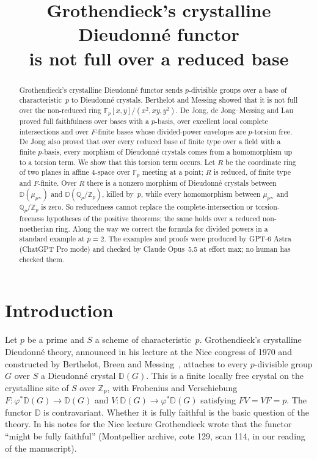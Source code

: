 \documentclass[11pt]{amsart}
\title[Not full over a reduced base]{Grothendieck's crystalline Dieudonn\'e functor\\ is not full over a reduced base}
\author{}
\date{}
\theoremstyle{remark}
\newcommand{\Fp}{\mathbb{F}_p}
\newcommand{\Zp}{\mathbb{Z}_p}
\newcommand{\Qp}{\mathbb{Q}_p}
\newcommand{\D}{\mathbb{D}}
\newcommand{\mup}{\mu_{p^\infty}}
\newcommand{\QZ}{\Qp/\Zp}
\begin{document}
\begin{abstract}
Grothendieck's crystalline Dieudonn\'e functor sends $p$-divisible groups over a base of characteristic~$p$ to
Dieudonn\'e crystals. Berthelot and Messing showed that it is not full over the non-reduced ring
$\Fp[x,y]/(x^2,xy,y^2)$. De Jong, de Jong--Messing and Lau proved full faithfulness over bases with a $p$-basis, over
excellent local complete intersections and over $F$-finite bases whose divided-power envelopes are $p$-torsion free.
De Jong also proved that over every reduced base of finite type over a field with a finite $p$-basis, every morphism of
Dieudonn\'e crystals comes from a homomorphism up to a torsion term. We show that this torsion term occurs. Let $R$ be
the coordinate ring of two planes in affine $4$-space over $\Fp$ meeting at a point; $R$ is reduced, of finite type and
$F$-finite. Over $R$ there is a nonzero morphism of Dieudonn\'e crystals between $\D(\mup)$ and $\D(\QZ)$, killed
by~$p$, while every homomorphism between $\mup$ and $\QZ$ is zero. So reducedness cannot replace the
complete-intersection or torsion-freeness hypotheses of the positive theorems; the same holds over a reduced
non-noetherian ring. Along the way we correct the formula for divided powers in a standard example at $p=2$. The
examples and proofs were produced by GPT-6 Astra (ChatGPT Pro mode) and checked by Claude Opus~5.5 at effort max; no
human has checked them.
\end{abstract}

\maketitle

\section{Introduction}

Let $p$ be a prime and $S$ a scheme of characteristic~$p$. Grothendieck's crystalline Dieudonn\'e theory, announced in
his lecture at the Nice congress of 1970 and constructed by Berthelot, Breen and Messing~\cite{BBM}, attaches to every
$p$-divisible group $G$ over $S$ a Dieudonn\'e crystal $\D(G)$. This is a finite locally free crystal on the
crystalline site of $S$ over $\Zp$, with Frobenius and Verschiebung $F\colon\varphi^*\D(G)\to\D(G)$ and
$V\colon\D(G)\to\varphi^*\D(G)$ satisfying $FV=VF=p$. The functor $\D$ is contravariant. Whether it is fully faithful
is the basic question of the theory. In his notes for the Nice lecture Grothendieck wrote that the functor ``might be
fully faithful'' (Montpellier archive, cote 129, scan 114, in our reading of the manuscript).
\end{document}
